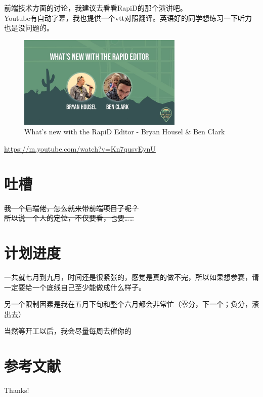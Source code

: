 \documentclass{beamer}
\begin{document}
\begin{frame}
    前端技术方面的讨论，我建议去看看RapiD的那个演讲吧。\\
    Youtube有自动字幕，我也提供一个vtt对照翻译。英语好的同学想练习一下听力也是没问题的。 \\
    

    \begin{figure}[H]
        \centering
        \includegraphics[width=0.7\textwidth]{figure/youtube-Kn7qusvEynU.jpg}
        \caption{What's new with the RapiD Editor - Bryan Housel \& Ben Clark}
    \end{figure}

    \url{https://m.youtube.com/watch?v=Kn7qusvEynU}
\end{frame}

\section{吐槽}

\begin{frame}
    \Large
    \sout{我一个后端佬，怎么就来带前端项目了呢？}\\
    \sout{所以说一个人的定位，不仅要看，也要……}
\end{frame}

\section{计划进度}
\begin{frame}
    一共就七月到九月，时间还是很紧张的，感觉是真的做不完，所以如果想参赛，请一定要给一个底线自己至少能做成什么样子。

    另一个限制因素是我在五月下旬和整个六月都会非常忙（零分，下一个；负分，滚出去）

    当然等开工以后，我会尽量每周去催你的
\end{frame}


\section{参考文献}

\begin{frame}[allowframebreaks]
    
    
\end{frame}

\begin{frame}
    \begin{center}
        {\Huge\calligra Thanks!}
    \end{center}
\end{frame}
\end{document}
